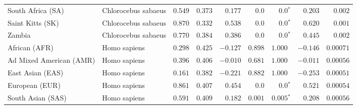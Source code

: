\begin{center}
\begin{adjustbox}{width = 1\textwidth}
\begin{tabular}{|l|l|r|r|r|r|r|r|r|}
              South Africa (SA) &  Chlorocebus sabaeus &                                        $ 0.549$ &                                           $ 0.373$ &                      $ 0.177$ &            $0.0$ &                  $\bm{0.0{^*}}$ &                                           $ 0.203$ &           $ 0.002$ \\
               Saint Kitts (SK) &  Chlorocebus sabaeus &                                        $ 0.870$ &                                           $ 0.332$ &                      $ 0.538$ &            $0.0$ &                  $\bm{0.0{^*}}$ &                                           $ 0.620$ &           $ 0.001$ \\
                         Zambia &  Chlorocebus sabaeus &                                        $ 0.770$ &                                           $ 0.384$ &                      $ 0.386$ &            $0.0$ &                  $\bm{0.0{^*}}$ &                                           $ 0.445$ &           $ 0.002$ \\
                  African (AFR) &         Homo sapiens &                                        $ 0.298$ &                                           $ 0.425$ &                      $-0.127$ &         $ 0.898$ &                      $ 1.000~~$ &                                           $-0.146$ &          $0.00071$ \\
        Ad Mixed American (AMR) &         Homo sapiens &                                        $ 0.396$ &                                           $ 0.406$ &                      $-0.010$ &         $ 0.681$ &                      $ 1.000~~$ &                                           $-0.011$ &          $0.00056$ \\
               East Asian (EAS) &         Homo sapiens &                                        $ 0.161$ &                                           $ 0.382$ &                      $-0.221$ &         $ 0.882$ &                      $ 1.000~~$ &                                           $-0.253$ &          $0.00051$ \\
                 European (EUR) &         Homo sapiens &                                        $ 0.861$ &                                           $ 0.407$ &                      $ 0.454$ &            $0.0$ &                  $\bm{0.0{^*}}$ &                                           $ 0.521$ &          $0.00054$ \\
              South Asian (SAS) &         Homo sapiens &                                        $ 0.591$ &                                           $ 0.409$ &                      $ 0.182$ &         $ 0.001$ &               $\bm{ 0.005{^*}}$ &                                           $ 0.208$ &          $0.00056$ \\

\end{tabular}
\end{adjustbox}
\end{center}
